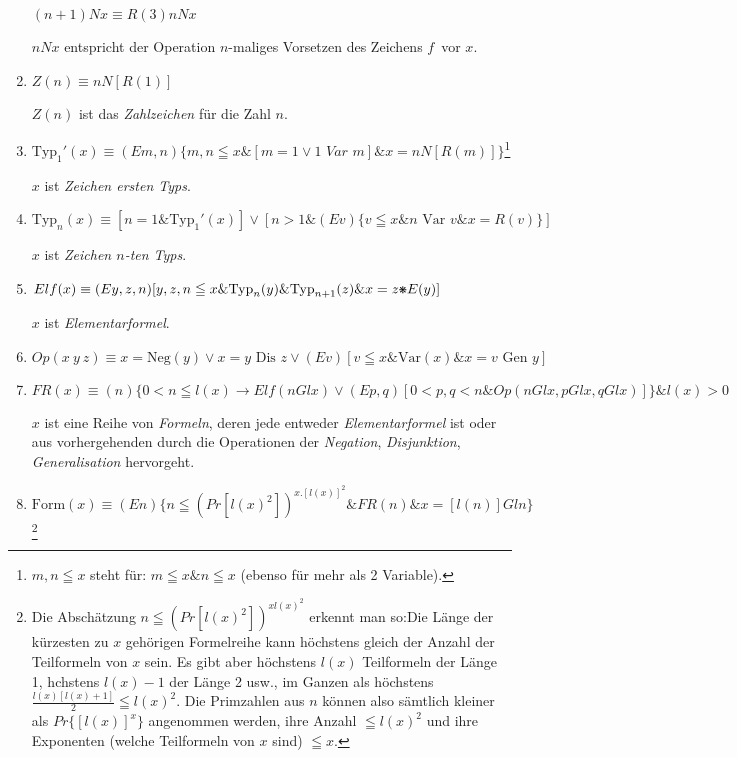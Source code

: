 \documentclass{scrartcl}
\newcommand{\fnvierunddreissigb}{34b}
\DeclareRobustCommand*{\pmstar}{%
  \text{%
      \resizebox{!}{.75\height}{\ding{107}}%
        }%
}
\begin{document}
\begin{enumerate}[1.]
	$(n + 1) N x \equiv R(3) n N x$

	$n N x$ entspricht der Operation \glqq$n$-maliges
	Vorsetzen des Zeichens \glq$f$\grq\ vor $x$\grqq.

	\item $Z(n) \equiv n N[R(1)]$

	$Z(n)$ ist das \textit{Zahlzeichen} für die Zahl $n$.

	\let\originalfootnote=\thefootnote
	\let\thefootnote=\fnvierunddreissigb
	\item $\text{Typ}_1'(x) \equiv (Em, n) \{m, n\leqq x \& [m = 1 \lor 1\textit{ Var } m] \& x = n N [R(m)]\}$\footnote{$m, n \leqq x$ steht für: $m \leqq x \& n \leqq x$ (ebenso für mehr als 2 Variable).}
	\let\thefootnote=\originalfootnote
	\setcounter{footnote}{34}

	$x$ ist \textit{Zeichen ersten Typs}.

	\item $\text{Typ}_n(x) \equiv [n = 1 \& \text{Typ}_1'(x)] \lor [n > 1 \& (Ev) \{v \leqq x \& n\text{ Var } v \& x = R(v)\}]$

	$x$ ist \textit{Zeichen $n$-ten Typs}.

	\item $Elf(x) \equiv (E y, z, n) [y, z, n \leqq x \& \text{Typ}_n(y) \& \text{Typ}_{n + 1}(z) \& x = z \pmstar E(y)]$

	$x$ ist \textit{Elementarformel}.

	\item $Op(x\ y\ z) \equiv x = \text{Neg}(y) \lor x = y \text{ Dis } z \lor (Ev) [v \leqq x \& \text{Var}(x) \& x = v \text{ Gen } y]$

	\item $FR(x) \equiv (n) \{ 0 < n \leqq l(x) \longrightarrow Elf(n Gl x) \lor (Ep, q) [0 < p, q < n \& Op(n Gl x, p Gl x, q Gl x)]\} \& l(x) > 0$

	$x$ ist eine Reihe von \textit{Formeln}, deren jede entweder
	\textit{Elementarformel} ist oder aus vorhergehenden durch die Operationen der \textit{Negation},
	\textit{Disjunktion}, \textit{Generalisation} hervorgeht.

	\item $\text{Form}(x) \equiv (En) \{n \leqq (Pr [l(x)^2])^{x.[l(x)]^2} \& FR(n) \& x = [l(n)] Gl n\}$\footnote{Die Abschätzung $n \leqq (Pr [l(x)^2])^{x l(x)^2}$ erkennt man so:Die Länge der kürzesten zu $x$ gehörigen Formelreihe kann höchstens gleich der Anzahl der Teilformeln von $x$ sein. Es gibt aber höchstens $l(x)$ Teilformeln der Länge 1, hchstens $l(x) - 1$ der Länge 2 usw., im Ganzen als höchstens $\frac{l(x)[l(x) + 1]}{2} \leqq l(x)^2$. Die Primzahlen aus $n$ können also sämtlich kleiner als $Pr\{[l(x)]^x\}$ angenommen werden, ihre Anzahl $\leqq l(x)^2$ und ihre Exponenten (welche Teilformeln von $x$ sind) $\leqq x$.}


\end{enumerate}
\end{document}
